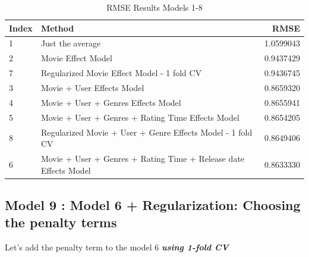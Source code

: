\documentclass[
]{article}
\begin{document}
\begin{table}[H]

\caption{\label{tab:cpt_6}RMSE Results Models 1-8\label{tbl:rmse_results_model_1-8}}
\centering
\fontsize{7}{9}\selectfont
\begin{tabular}[t]{llr}
\toprule
Index & Method & RMSE\\
\midrule
1 & Just the average & 1.0599043\\
2 & Movie Effect Model & 0.9437429\\
7 & Regularized Movie Effect Model - 1 fold CV & 0.9436745\\
3 & Movie + User Effects Model & 0.8659320\\
4 & Movie + User + Genres Effects Model & 0.8655941\\
5 & Movie + User + Genres + Rating Time Effects Model & 0.8654205\\
8 & Regularized Movie + User + Genre Effects Model - 1 fold CV & 0.8649406\\
6 & Movie + User + Genres + Rating Time + Release date Effects Model & 0.8633330\\
\bottomrule
\end{tabular}
\end{table}

\newpage

\hypertarget{model-9-model-6-regularization-choosing-the-penalty-terms}{%
\subsection{Model 9 : Model 6 + Regularization: Choosing the penalty
terms}\label{model-9-model-6-regularization-choosing-the-penalty-terms}}

Let's add the penalty term to the model 6 \textbf{\emph{using 1-fold
CV}}
\end{document}
